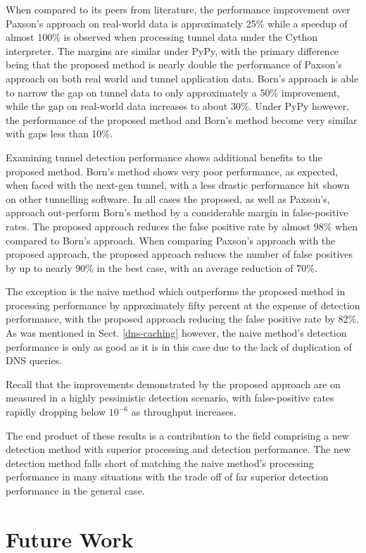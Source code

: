 \documentclass{llncs}
\begin{document}
When compared to its peers from literature, the performance improvement over
Paxson's approach on real-world data is approximately 25\% while a speedup of
almost 100\% is observed when processing tunnel data under the Cython
interpreter. The margins are similar under PyPy, with the primary difference
being that the proposed method is nearly double the performance of Paxson's
approach on both real world and tunnel application data. Born's approach is able
to narrow the gap on tunnel data to only approximately a 50\% improvement, while
the gap on real-world data increases to about 30\%. Under PyPy however, the
performance of the proposed method and Born's method become very similar with
gaps less than 10\%.

Examining tunnel detection performance shows additional benefits to the proposed
method. Born's method shows very poor performance, as expected, when faced with
the next-gen tunnel, with a less drastic performance hit shown on other
tunnelling software. In all cases the proposed, as well as Paxson's, approach
out-perform Born's method by a considerable margin in false-positive rates. The
proposed approach reduces the false positive rate by almost 98\% when compared
to Born's approach. When comparing Paxson's approach with the proposed
approach, the proposed approach reduces the number of false positives by up to
nearly 90\% in the best case, with an average reduction of 70\%.

The exception is the naive method which outperforms the proposed method in
processing performance by approximately fifty percent at the expense of
detection performance, with the proposed approach reducing the false positive
rate by 82\%. As was mentioned in Sect. \ref{dns-caching} however,
the naive method's detection performance is only as good as it is in this case
due to the lack of duplication of DNS queries.

Recall that the improvements demonstrated by the proposed approach are on
measured in a highly pessimistic detection scenario, with false-positive rates
rapidly dropping below $10^{-6}$ as throughput increases.

The end product of these results is a contribution to the field comprising a new
detection method with superior processing and detection performance. The new
detection method falls short of matching the naive method's processing
performance in many situations with the trade off of far superior detection
performance in the general case.

\section{Future Work}
\end{document}
